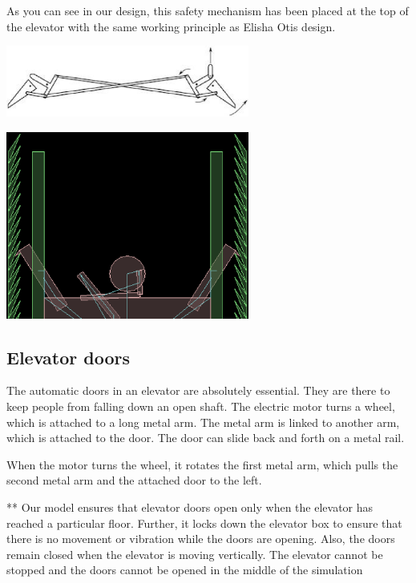 \documentclass[a4paper,11pt]{article}
\begin{document}
As you can see in our design, this safety mechanism has been placed at the top of the elevator with the same working principle as Elisha Otis design.

\begin{center}
\includegraphics[width=0.6\textwidth]{images/safetyOrig.eps} 
\end{center}


\begin{center}
\includegraphics[width=0.6\textwidth]{images/safety.eps} 
\end{center}

\subsection{Elevator doors}

The automatic doors in an elevator are absolutely essential. They are there to keep people from falling down an open shaft.
The electric motor turns a wheel, which is attached to a long metal arm. The metal arm is linked to another arm, which is attached to the door. The door can slide back and forth on a metal rail.

When the motor turns the wheel, it rotates the first metal arm, which pulls the second metal arm and the attached door to the left. 

** Our model ensures that elevator doors open only when the elevator has reached a particular floor. Further, it locks down the elevator box to ensure that there is no movement or vibration while the doors are opening. Also, the doors remain closed when the elevator is moving vertically. The elevator cannot be stopped and the doors cannot be opened in the middle of the simulation 
\end{document}
